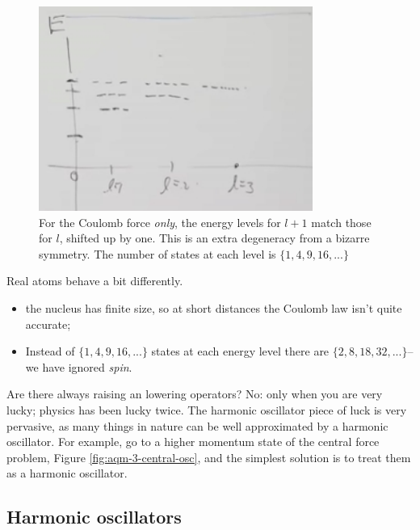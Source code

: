 \documentclass[]{article}
\begin{document}
\begin{figure}[H]
	\begin{center}
		\caption[Energy Levels for the Coulomb Force]{For the Coulomb force \emph{only}, the energy levels for $l+1$ match those for $l$, shifted up by one. This is an extra degeneracy from a bizarre symmetry. The number of states at each level is  $\{1,4,9,16,...\}$}\label{fig:aqm-3-central-coulomb}
		\includegraphics[width=0.8\textwidth]{aqm-3-central-coulomb}
	\end{center}
\end{figure}

Real atoms behave a bit differently.
\begin{itemize}
	\item the nucleus has finite size, so at short distances the Coulomb law isn't quite accurate;
	\item Instead of  $\{1,4,9,16,...\}$ states at each energy level there are  $\{2,8,18,32,...\}$--we have ignored \emph{spin}.
\end{itemize}

Are there always raising an lowering operators? No: only when you are very lucky; physics has been lucky twice. The harmonic oscillator piece of luck is very pervasive, as many things in nature can be well approximated by a harmonic oscillator. For example, go to a higher momentum state of the central force problem, Figure \ref{fig:aqm-3-central-osc}, and the simplest solution is to treat them as a harmonic oscillator.

\subsection{Harmonic oscillators}\label{sect:harmonic:oscillators}
\end{document}
